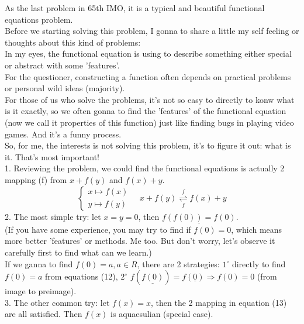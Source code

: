 \documentclass{Math_Note}
\begin{document}
\begin{sol}
As the last problem in 65th IMO, it is a typical and beautiful functional equations problem. \\
\marginpar{\textcolor{softcyan}{reflection}}
\textcolor{softcyan}{
Before we starting solving this problem, I gonna to share a little my self feeling or thoughts about this kind of problems: \\
In my eyes, the functional equation is using to describe something either special or abstract with some 'features'. \\
For the questioner, constructing a function often depends on practical problems or personal wild ideas (majority). \\
For those of us who solve the problems, it's not so easy to directly to konw what is it exactly, so we often gonna to find the 'features' of 
the functional equation (now we call it properties of this function) just like finding bugs in playing video games. And it's a funny process. \\
So, for me, the interests is not solving this problem, it's to figure it out: what is it. That's most important! \\
}
\marginpar{\textcolor{softcyan}{attempts}}
1. Reviewing the problem, we could find the functional equations is actually 2 mapping (f) from $x+f(y)$ and $f(x)+y$.\\
\begin{equation}
    \begin{cases}
        x \mapsto f(x) \\
        y \mapsto f(y)
    \end{cases}
    \quad
    x+f(y) \underset{f}{\overset{f}{\rightleftharpoons}} f(x)+y
\end{equation}
2. The most simple try: let $x=y=0$, then $\underline{f(f(0))=f(0)}$. \\
\textcolor{softcyan}{
(If you have some experience, you may try to find if $f(0)=0$, which means more better 'features' or methods. Me too. But don't worry, let's observe it carefully first to find what can we learn.)\\
}
If we ganna to find $f(0)=a, a\in R$, there are 2 strategies: $1^{\circ}$ directly to find $f(0)=a$ from equations (12), $2^{\circ}$ $f(\underline{f(0)})=f(\underline{0}) \Longrightarrow f(0)=0$ (from image to preimage).\\
3. The other common try: let $f(x)=x$, then the 2 mapping in equation (13) are all satisfied. Then $f(x)$ is aquaesulian (special case). \\

\end{sol}
\end{document}
